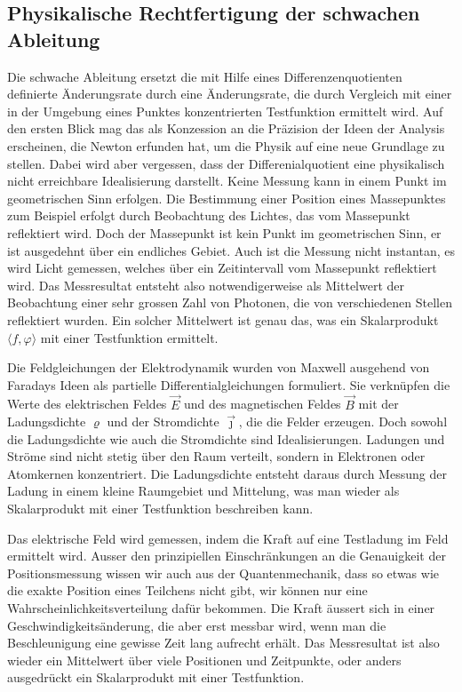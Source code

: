 \subsection{Physikalische Rechtfertigung der schwachen Ableitung}
Die schwache Ableitung ersetzt die mit Hilfe eines Differenzenquotienten
definierte Änderungsrate durch eine Änderungsrate, die durch Vergleich
mit einer in der Umgebung eines Punktes konzentrierten Testfunktion
ermittelt wird.
Auf den ersten Blick mag das als Konzession an die Präzision der Ideen
der Analysis erscheinen, die Newton erfunden hat, um die Physik auf eine
neue Grundlage zu stellen.
Dabei wird aber vergessen, dass der Differenialquotient eine physikalisch
nicht erreichbare Idealisierung darstellt.
Keine Messung kann in einem Punkt im geometrischen Sinn erfolgen.
Die Bestimmung einer Position eines Massepunktes zum Beispiel erfolgt
durch Beobachtung des Lichtes, das vom Massepunkt reflektiert wird.
Doch der Massepunkt ist kein Punkt im geometrischen Sinn, er ist ausgedehnt
über ein endliches Gebiet.
Auch ist die Messung nicht instantan, es wird Licht gemessen, welches
über ein Zeitintervall vom Massepunkt reflektiert wird.
Das Messresultat entsteht also notwendigerweise als Mittelwert der
Beobachtung einer sehr grossen Zahl von Photonen, die von verschiedenen
Stellen reflektiert wurden.
Ein solcher Mittelwert ist genau das, was ein Skalarprodukt
$\langle f,\varphi\rangle$ mit einer Testfunktion ermittelt.

Die Feldgleichungen der Elektrodynamik wurden von Maxwell ausgehend
von Faradays Ideen als partielle Differentialgleichungen formuliert.
Sie verknüpfen die Werte des elektrischen Feldes $\vec{E}$ und des
magnetischen Feldes $\vec{B}$ mit der Ladungsdichte $\varrho$
und der Stromdichte $\vec{\jmath}$, die die Felder erzeugen.
Doch sowohl die Ladungsdichte wie auch die Stromdichte sind Idealisierungen.
Ladungen und Ströme sind nicht stetig über den Raum verteilt, sondern 
in Elektronen oder Atomkernen konzentriert.
Die Ladungsdichte entsteht daraus durch Messung der Ladung in einem kleine
Raumgebiet und Mittelung, was man wieder als Skalarprodukt mit einer
Testfunktion beschreiben kann.

Das elektrische Feld wird gemessen, indem die Kraft auf eine Testladung
im Feld ermittelt wird.
Ausser den prinzipiellen Einschränkungen an die Genauigkeit der
Positionsmessung wissen wir auch aus der Quantenmechanik, dass so etwas
wie die exakte Position eines Teilchens nicht gibt, wir können nur eine
Wahrscheinlichkeitsverteilung dafür bekommen.
Die Kraft äussert sich in einer Geschwindigkeitsänderung, die aber erst
messbar wird, wenn man die Beschleunigung eine gewisse Zeit lang aufrecht
erhält.
Das Messresultat ist also wieder ein Mittelwert über viele Positionen
und Zeitpunkte, oder anders ausgedrückt ein Skalarprodukt mit einer
Testfunktion.

